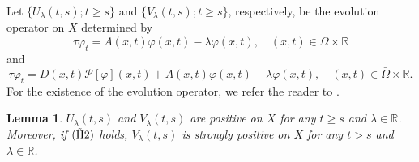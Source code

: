 \documentclass[11pt,reqno]{amsart}
\newtheorem{lemma}[theorem]{Lemma}
\numberwithin{equation}{section}
\begin{document}
Let $\{U_{\lambda}(t,s);t \geq s \}$ and $\{V_{\lambda}(t,s); t\geq s \}$, respectively, be the evolution operator on $X$ determined by
\begin{equation*}
\tau\varphi_{t}=A(x,t)\varphi(x,t)-\lambda\varphi(x,t),\quad
(x,t)\in \bar\Omega\times\mathbb{R}
\end{equation*}
and
\begin{equation*}
\tau\varphi_{t}=D(x,t)\mathcal{P}[\varphi](x,t)+A(x,t)\varphi(x,t)-\lambda\varphi(x,t), \quad
(x,t)\in \bar\Omega\times\mathbb{R}.
\end{equation*}
For the existence of the evolution operator, we refer the reader to \cite[Chapter 5]{Pazy}.
\begin{lemma}\label{LEM2.8}
$U_{\lambda}(t,s)$ and $V_{\lambda}(t,s)$ are positive on $X$ for any $t\geq s$ and $\lambda\in\mathbb{R}$. Moreover, if ${ \rm (\tilde{H}2) }$ holds,
$V_{\lambda}(t,s)$ is strongly positive on $X$ for any $t> s$ and $\lambda\in\mathbb{R}$.
\end{lemma}
\end{document}

